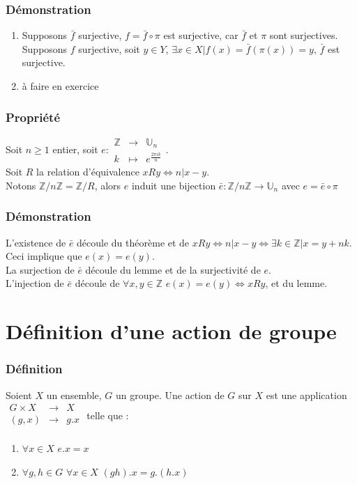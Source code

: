 \documentclass[a4paper, oneside]{report}
\newcommand{\x}{\times}
\newcommand{\Z}{\mathbb{Z}}
\newcommand{\U}{\mathbb{U}}
\begin{document}
\subsubsection{Démonstration}
\begin{enumerate}

\item Supposons $\bar{f}$ surjective, $f=\bar{f}\circ \pi$ est surjective, car $\bar{f}$ et $\pi$ sont surjectives.\\

Supposons $f$ surjective, soit $y\in Y$, $\exists x \in X | f(x)=\bar{f}(\pi(x))=y$, $\bar{f}$ est surjective.
\item à faire en exercice
\end{enumerate}

\subsubsection{Propriété}
Soit $n\geq 1$ entier, soit $e:\begin{array}{lll}
 \Z &\rightarrow &\U_n\\
k&\mapsto&e^{\frac{2\pi i k}{n}}
\end{array}$.\\
Soit $R$ la relation d'équivalence $xRy\Leftrightarrow n|x-y$.\\
Notons $\Z/n\Z=\Z/R$, alors $e$ induit une bijection $\bar{e}:\Z/n\Z \rightarrow \U_n$ avec $e=\bar{e}\circ \pi$

\subsubsection{Démonstration}
L'existence de $\bar{e}$ découle du théorème et de $xRy \Leftrightarrow n|x-y \Leftrightarrow \exists k\in \Z | x=y+nk$.\\
Ceci implique que $e(x)=e(y)$.\\
La surjection de $\bar{e}$ découle du lemme et de la surjectivité de $e$.\\
L'injection de $\bar{e}$ découle de $\forall x,y\in \Z$ $e(x)=e(y)\Leftrightarrow xRy$, et du lemme.

\section{Définition d'une action de groupe}

\subsubsection{Définition}
Soient $X$ un ensemble, $G$ un groupe. Une action de $G$ sur $X$ est une application $\begin{array}{lll}
G\x X &\rightarrow & X\\
(g,x)&\rightarrow & g.x\\
\end{array}$ telle que :
\begin{enumerate}
\item $\forall x\in X$ $e.x=x$\\
\item $\forall g,h\in G$ $\forall x\in X$ $(gh).x=g.(h.x)$
\end{enumerate}
\end{document}
